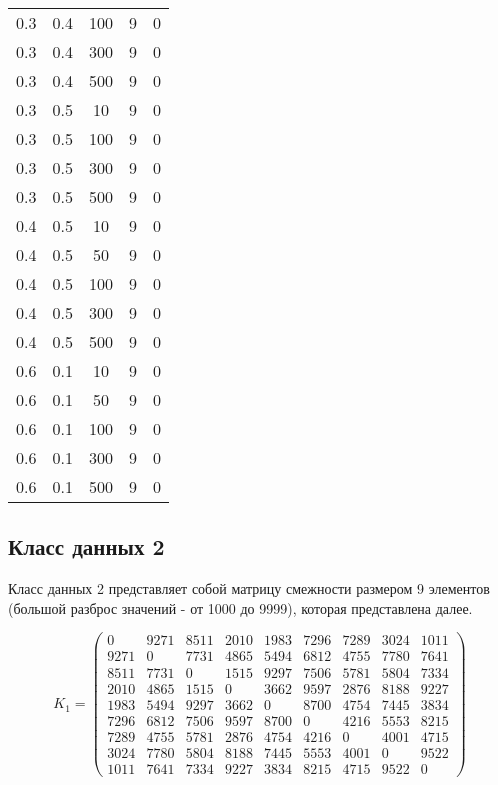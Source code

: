 \begin{center}
\begin{longtable}[c]{|c|c|c|c|c|}
        0.3 & 0.4 & 100 &    9 &    0 \\
        0.3 & 0.4 & 300 &    9 &    0 \\
        0.3 & 0.4 & 500 &    9 &    0 \\ \hline
        0.3 & 0.5 &  10 &    9 &    0 \\
        0.3 & 0.5 & 100 &    9 &    0 \\
        0.3 & 0.5 & 300 &    9 &    0 \\
        0.3 & 0.5 & 500 &    9 &    0 \\ \hline
        0.4 & 0.5 &  10 &    9 &    0 \\
        0.4 & 0.5 &  50 &    9 &    0 \\
        0.4 & 0.5 & 100 &    9 &    0 \\
        0.4 & 0.5 & 300 &    9 &    0 \\
        0.4 & 0.5 & 500 &    9 &    0 \\ \hline
        0.6 & 0.1 &  10 &    9 &    0 \\
        0.6 & 0.1 &  50 &    9 &    0 \\
        0.6 & 0.1 & 100 &    9 &    0 \\
        0.6 & 0.1 & 300 &    9 &    0 \\
        0.6 & 0.1 & 500 &    9 &    0 \\ \hline
\end{longtable}
\end{center}


\subsection{Класс данных 2}

Класс данных 2 представляет собой матрицу смежности размером 9 элементов (большой разброс значений - от 1000 до 9999), которая представлена далее.

\begin{equation}
    \label{eq:kd2}
	K_{1} = \begin{pmatrix}
		0 & 9271 & 8511 & 2010 & 1983 & 7296 & 7289 & 3024 & 1011 \\
        9271 & 0 & 7731 & 4865 & 5494 & 6812 & 4755 & 7780 & 7641 \\
        8511 & 7731 & 0 & 1515 & 9297 & 7506 & 5781 & 5804 & 7334 \\
        2010 & 4865 & 1515 & 0 & 3662 & 9597 & 2876 & 8188 & 9227 \\
        1983 & 5494 & 9297 & 3662 & 0 & 8700 & 4754 & 7445 & 3834 \\
        7296 & 6812 & 7506 & 9597 & 8700 & 0 & 4216 & 5553 & 8215 \\
        7289 & 4755 & 5781 & 2876 & 4754 & 4216 & 0 & 4001 & 4715 \\
        3024 & 7780 & 5804 & 8188 & 7445 & 5553 & 4001 & 0 & 9522 \\
        1011 & 7641 & 7334 & 9227 & 3834 & 8215 & 4715 & 9522 & 0 
	\end{pmatrix}
\end{equation}


